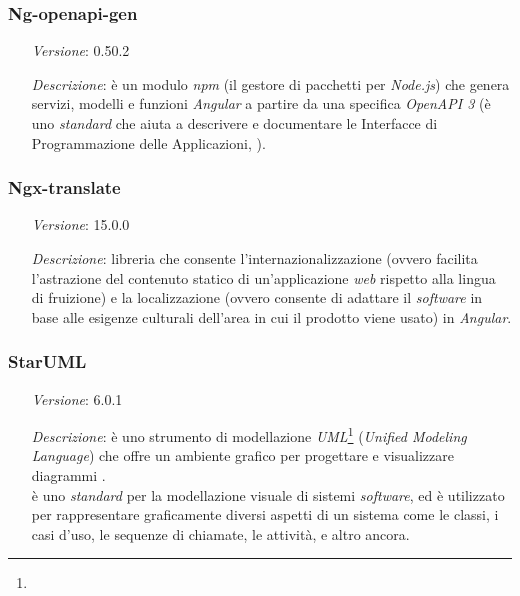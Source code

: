    \subsubsection*{Ng-openapi-gen}
    \begin{itemize}[align=left]
        \item [\textit{Versione}:] 0.50.2
        \item [\textit{Descrizione}:] è un modulo \textit{npm} (il gestore di pacchetti per \textit{Node.js}) che genera servizi,
                    modelli e funzioni \textit{Angular} a partire da una specifica \textit{OpenAPI 3} (è uno \textit{standard} che aiuta a descrivere e documentare le Interfacce di Programmazione delle Applicazioni, ).
    \end{itemize}

    \subsubsection*{Ngx-translate}
    \begin{itemize}[align=left]
        \item [\textit{Versione}:] 15.0.0
        \item [\textit{Descrizione}:] libreria che consente l'internazionalizzazione (ovvero facilita l'astrazione del contenuto statico di un'applicazione \textit{web} rispetto alla lingua di fruizione) e la localizzazione (ovvero consente di adattare il \textit{software} in base alle esigenze culturali dell'area in cui il prodotto viene usato) in \textit{Angular}.
    \end{itemize}

    \subsubsection*{StarUML}
    \begin{itemize}[align=left]
        \item [\textit{Versione}:] 6.0.1
        \item [\textit{Descrizione}:] è uno strumento di modellazione \textit{UML}\footnote{} (\textit{Unified Modeling Language}) che offre un ambiente grafico per progettare e visualizzare diagrammi . \\
                 è uno \textit{standard} per la modellazione visuale di sistemi \textit{software}, ed è utilizzato per rappresentare graficamente diversi aspetti di un sistema come le classi, i casi d'uso, le sequenze di chiamate, le attività, e altro ancora.
    \end{itemize}

